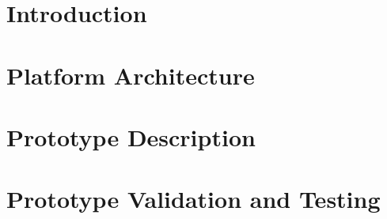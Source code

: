 \documentclass{SmartReport}
\begin{document}
\section{Introduction}
\label{sec:intro}


\newpage


\section{Platform Architecture}
\label{sec:arch}

\newpage

% 

% 


\section{Prototype Description}
\label{sec:sw}

\newpage

\section{Prototype Validation and Testing}
\label{sec:val}

\newpage


\end{document}
